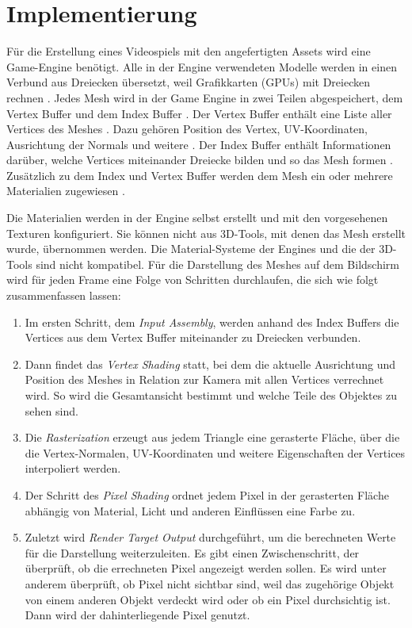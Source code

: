 \section{Implementierung}\label{Implementierung1}
Für die Erstellung eines Videospiels mit den angefertigten Assets wird eine Game-Engine benötigt. Alle in der Engine verwendeten Modelle werden in einen Verbund aus Dreiecken übersetzt, weil Grafikkarten (GPUs) mit Dreiecken rechnen \parencite{gpu}. Jedes Mesh wird in der Game Engine in zwei Teilen abgespeichert, dem Vertex Buffer und dem Index Buffer \parencite{gpu}. Der Vertex Buffer enthält eine Liste aller Vertices des Meshes \parencite{gpu}. Dazu gehören Position des Vertex, UV-Koordinaten, Ausrichtung der Normals und weitere \parencite{gpu}. Der Index Buffer enthält Informationen darüber, welche Vertices miteinander Dreiecke bilden und so das Mesh formen \parencite{gpu}. Zusätzlich zu dem Index und Vertex Buffer werden dem Mesh ein oder mehrere Materialien zugewiesen \parencite{gpu}. 
\par
Die Materialien werden in der Engine selbst erstellt und mit den vorgesehenen Texturen konfiguriert. Sie können nicht aus 3D-Tools, mit denen das Mesh erstellt wurde, übernommen werden. Die Material-Systeme der Engines und die der 3D-Tools sind nicht kompatibel.
\newpage
Für die Darstellung des Meshes auf dem Bildschirm wird für jeden Frame eine Folge von Schritten durchlaufen, die sich wie folgt zusammenfassen lassen:
\begin{enumerate}
\item Im ersten Schritt, dem \textit{Input Assembly}, werden anhand des Index Buffers die Vertices aus dem Vertex Buffer miteinander zu Dreiecken verbunden.
\item Dann findet das \textit{Vertex Shading} statt, bei dem die aktuelle Ausrichtung und Position des Meshes in Relation zur Kamera mit allen Vertices verrechnet wird. So wird die Gesamtansicht bestimmt und welche Teile des Objektes zu sehen sind.
\item Die \textit{Rasterization} erzeugt aus jedem Triangle eine gerasterte Fläche, über die die Vertex-Normalen, UV-Koordinaten und weitere Eigenschaften der Vertices interpoliert werden.
\item Der Schritt des \textit{Pixel Shading} ordnet jedem Pixel in der gerasterten Fläche abhängig von Material, Licht und anderen Einflüssen eine Farbe zu.
\item  Zuletzt wird \textit{Render Target Output} durchgeführt, um die berechneten Werte für die Darstellung weiterzuleiten. Es gibt einen Zwischenschritt, der überprüft, ob die errechneten Pixel angezeigt werden sollen. Es wird unter anderem überprüft, ob Pixel nicht sichtbar sind, weil das zugehörige Objekt von einem anderen Objekt verdeckt wird oder ob ein Pixel durchsichtig ist. Dann wird der dahinterliegende Pixel genutzt.
\vspace{-10.5pt}
\begin{flushright}\parencite{gpu}\end{flushright}
\end{enumerate}
